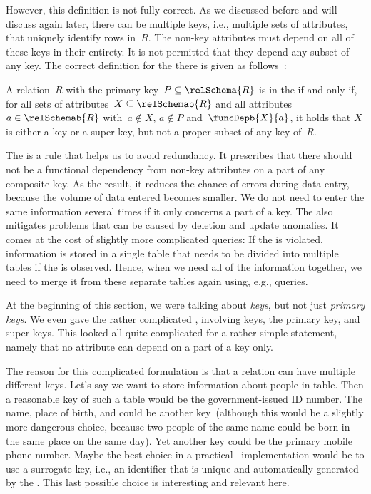 However, this definition is not fully correct.
As we discussed before and will discuss again later, there can be multiple keys, i.e., multiple sets of attributes, that uniquely identify rows in~$R$.
The non-key attributes must depend on all of these keys in their entirety.
It is not permitted that they depend any subset of any key.
The correct definition for the  there is given as follows~\cite{SS2005EIDDDFDB:SDWSD2}:%
%
\begin{definition}%
\label{def:2nf}%
A relation~$R$ with the primary key~$P\subseteq\relSchema{R}$ is in the  if and only if, for all sets of attributes~$X\subseteq\relSchemab{R}$ and all attributes~$a\in\relSchemab{R}$ with~$a\not\in X$, $a\not\in P$ and~$\funcDepb{X}{a}$, it holds that $X$ is either a key or a super key, but not a proper subset of any key of~$R$.%
\end{definition}%
%
%
%
%
%
The  is a rule that helps us to avoid redundancy.
It prescribes that there should not be a functional dependency from non-key attributes on a part of any composite key.
As the result, it reduces the chance of errors during data entry, because the volume of data entered becomes smaller.
We do not need to enter the same information several times if it only concerns a part of a key.
The  also mitigates problems that can be caused by deletion and update anomalies.
It comes at the cost of slightly more complicated queries:
If the  is violated, information is stored in a single table that needs to be divided into multiple tables if the  is observed.
Hence, when we need all of the information together, we need to merge it from these separate tables again using, e.g.,  queries.

At the beginning of this section,  we were talking about \emph{keys}, but not just \emph{primary keys}.
We even gave the rather complicated , involving keys, the primary key, and super keys.
This looked all quite complicated for a rather simple statement, namely that no attribute can depend on a part of a key only.

The reason for this complicated formulation is that a relation can have multiple different keys.
Let's say we want to store information about people in table.
Then a reasonable key of such a table would be the government-issued ID number.
The name, place of birth, and  could be another key~(although this would be a slightly more dangerous choice, because two people of the same name could be born in the same place on the same day).
Yet another key could be the primary mobile phone number.
Maybe the best choice in a practical \db\ implementation would be to use a surrogate key, i.e., an identifier
that is unique and automatically generated by the \dbms.
This last possible choice is interesting and relevant here.

